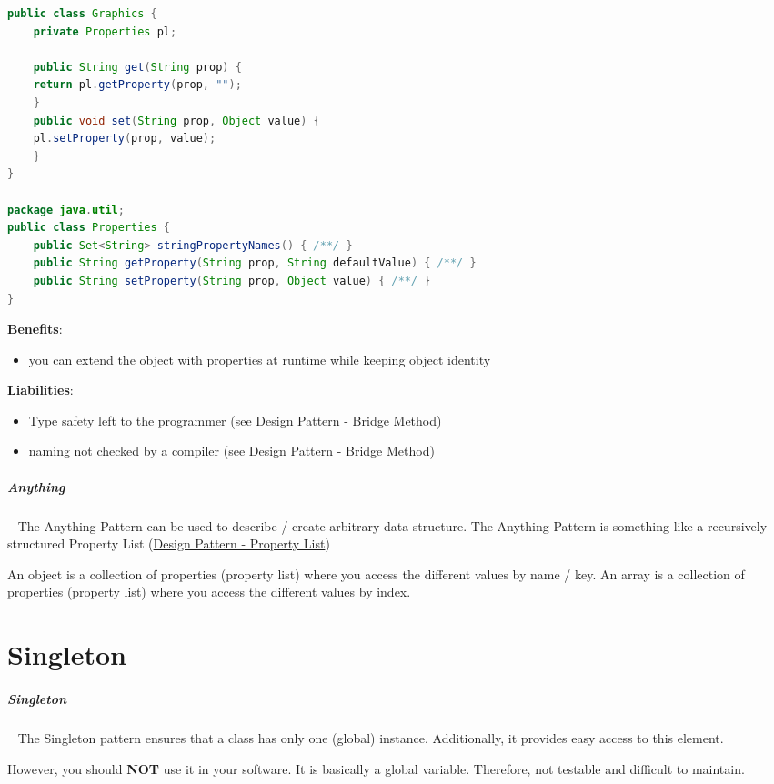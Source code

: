 \documentclass[8pt,twoside,landscape]{extarticle}
\begin{document}
\begin{multicols}{4}
\begin{lstlisting}[language=java,label=lst:example-for-anything,caption={Example for Anything},captionpos=b,numbers=none]
public class Graphics {
    private Properties pl;

    public String get(String prop) {
	return pl.getProperty(prop, "");
    }
    public void set(String prop, Object value) {
	pl.setProperty(prop, value);
    }
}

package java.util;
public class Properties {
    public Set<String> stringPropertyNames() { /**/ }
    public String getProperty(String prop, String defaultValue) { /**/ }
    public String setProperty(String prop, Object value) { /**/ }
}
\end{lstlisting}


\textbf{Benefits}:
\begin{itemize}
\item you can extend the object with properties at runtime while keeping object identity
\end{itemize}


\textbf{Liabilities}:
\begin{itemize}
\item Type safety left to the programmer (see \href{../../../roam/20230115180651-design_pattern_bridge_method.org}{Design Pattern - Bridge Method})
\item naming not checked by a compiler (see \href{../../../roam/20230115180651-design_pattern_bridge_method.org}{Design Pattern - Bridge Method})
\end{itemize}
\subparagraph{Anything} \
\label{sec:org6feb0aa}
The Anything Pattern can be used to describe / create arbitrary data structure.
The Anything Pattern is something like a recursively structured Property List (\href{../../../roam/20230115171958-design_pattern_property_list.org}{Design Pattern - Property List})

An object is a collection of properties (property list) where you access the different values by name / key.
An array is a collection of properties (property list) where you access the different values by index.
\section{Singleton}
\label{sec:org1f25cc7}
\subparagraph{Singleton} \
\label{sec:org3722bee}
The Singleton pattern ensures that a class has only one (global) instance.
Additionally, it provides easy access to this element.

However, you should \textbf{NOT} use it in your software.
It is basically a global variable.
Therefore, not testable and difficult to maintain.


\end{multicols}
\end{document}
